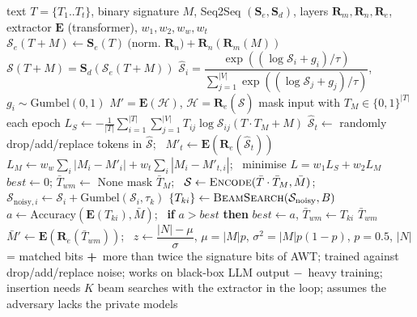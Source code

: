 \documentclass[10pt,a4paper,twocolumn]{article}
\newcommand{\pro}[1]{\Statex\textcolor{proc}{\textbf{+}\ #1}}
\newcommand{\con}[1]{\Statex\textcolor{conc}{\textbf{$-$}\ #1}}
\begin{document}
\begin{algorithm}[H]\small
\caption{REMARK-LLM (Zhang et al.\ 2023)}
\begin{algorithmic}[1]
\Require text $T=\{T_1..T_t\}$, binary signature $M$, Seq2Seq $(\mathbf S_e,\mathbf S_d)$, layers $\mathbf R_m,\mathbf R_n,\mathbf R_e$, extractor $\mathbf E$ (transformer), $w_1,w_2,w_w,w_t$
 \State $\mathcal S_e(T+M)\gets\mathbf S_e(T)\ \text{(norm. }\mathbf R_n)+\mathbf R_n(\mathbf R_m(M))$ 
 \State \Return $\mathcal S(T+M)=\mathbf S_d(\mathcal S_e(T+M))$ 
\EndFunction
{} \State \Return $\hat{\mathcal S}_i=\dfrac{\exp((\log\mathcal S_i+g_i)/\tau)}{\sum_{j=1}^{|V|}\exp((\log\mathcal S_j+g_j)/\tau)}$, $g_i\sim\mathrm{Gumbel}(0,1)$ \EndFunction
{} \State \Return $M'=\mathbf E(\mathcal H)$, $\mathcal H=\mathbf R_e(\hat{\mathcal S})$ \EndFunction
{}
 \State mask input with $T_M\in\{0,1\}^{|T|}$ each epoch
 \State $L_S\gets-\frac1{|T|}\sum_{i=1}^{|T|}\sum_{j=1}^{|V|}T_{ij}\log\mathcal S_{ij}(T\cdot T_M+M)$
 \State $\hat{\mathcal S}_t\gets$ randomly drop/add/replace tokens in $\hat{\mathcal S}$; \ $M'_t\gets\mathbf E(\mathbf R_e(\hat{\mathcal S}_t))$
 \State $L_M\gets w_w\sum_i|M_i-M'_i|+w_t\sum_i|M_i-M'_{t,i}|$; \ minimise $L=w_1L_S+w_2L_M$
\EndProcedure
{}
 \State $\mathit{best}\gets0$; $\bar T_{wm}\gets$ None
  \State mask $\bar T_M$; \ $\mathcal S\gets\textsc{Encode}(\bar T\cdot\bar T_M,\bar M)$; \ $\mathcal S_{\mathrm{noisy},i}\gets\mathcal S_i+\mathrm{Gumbel}(\mathcal S_i,\tau_k)$
  \State $\{T_{ki}\}\gets\textsc{BeamSearch}(\mathcal S_{\mathrm{noisy}},B)$
   \State $a\gets\mathrm{Accuracy}(\mathbf E(T_{ki}),\bar M)$; \ \textbf{if} $a>\mathit{best}$ \textbf{then} $\mathit{best}\gets a$, $\bar T_{wm}\gets T_{ki}$
  \EndFor
 \EndFor
 \State \Return $\bar T_{wm}$
\EndProcedure
{}
 \State $\bar M'\gets\mathbf E(\mathbf R_e(\bar T_{wm}))$; \ $z\gets\dfrac{|N|-\mu}{\sigma}$, $\mu=|M|p$, $\sigma^2=|M|p(1-p)$, $p=0.5$, $|N|$ = matched bits
\EndProcedure
\pro{more than twice the signature bits of AWT; trained against drop/add/replace noise; works on black-box LLM output}
\con{heavy training; insertion needs $K$ beam searches with the extractor in the loop; assumes the adversary lacks the private models}
\end{algorithmic}
\end{algorithm}
\end{document}
